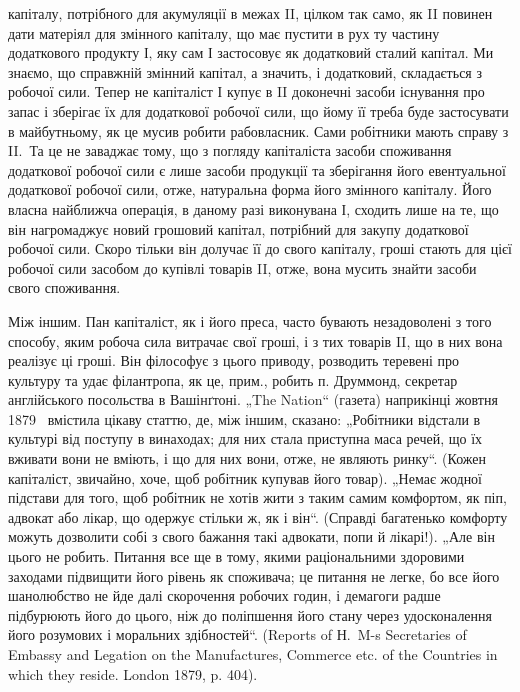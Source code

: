 \parcont{}  %
капіталу, потрібного для акумуляції в межах II, цілком так само, як II
повинен дати матеріял для змінного капіталу, що має пустити в рух ту
частину додаткового продукту І, яку сам І застосовує як додатковий
сталий капітал. Ми знаємо, що справжній змінний капітал, а значить, і
додатковий, складається з робочої сили. Тепер не капіталіст І купує в II
доконечні засоби існування про запас і зберігає їх для додаткової робочої
сили, що йому її треба буде застосувати в майбутньому, як це
мусив робити рабовласник. Сами робітники мають справу з II.~Та це не
заваджає тому, що з погляду капіталіста засоби споживання додаткової
робочої сили є лише засоби продукції та зберігання його евентуальної
додаткової робочої сили, отже, натуральна форма його змінного капіталу.
Його власна найближча операція, в даному разі виконувана І, сходить
лише на те, що він нагромаджує новий грошовий капітал, потрібний для
закупу додаткової робочої сили. Скоро тільки він долучає її до свого
капіталу, гроші стають для цієї робочої сили засобом до купівлі
товарів II, отже, вона мусить знайти засоби свого споживання.

Між іншим. Пан капіталіст, як і його преса, часто бувають незадоволені
з того способу, яким робоча сила витрачає свої гроші, і з
тих товарів II, що в них вона реалізує ці гроші. Він філософує з цього
приводу, розводить теревені про культуру та удає філантропа, як це,
прим., робить п. Друммонд, секретар англійського посольства в Вашінґтоні.
„The Nation“ (газета) наприкінці жовтня 1879~ вмістила цікаву
статтю, де, між іншим, сказано: „Робітники відстали в культурі від поступу
в винаходах; для них стала приступна маса речей, що їх вживати
вони не вміють, і що для них вони, отже, не являють ринку“.
(Кожен капіталіст, звичайно, хоче, щоб робітник купував його товар).
„Немає жодної підстави для того, щоб робітник не хотів жити з таким
самим комфортом, як піп, адвокат або лікар, що одержує стільки ж, як
і він“. (Справді багатенько комфорту можуть дозволити собі з свого бажання
такі адвокати, попи й лікарі!). „Але він цього не робить. Питання
все ще в тому, якими раціональними здоровими заходами підвищити його
рівень як споживача; це питання не легке, бо все його шанолюбство не
йде далі скорочення робочих годин, і демагоги радше підбурюють його
до цього, ніж до поліпшення його стану через удосконалення його розумових
і моральних здібностей“. (Reports of Н.~M-s Secretaries of Embassy
and Legation on the Manufactures, Commerce etc. of the Countries in
which they reside. London 1879, p. 404).

